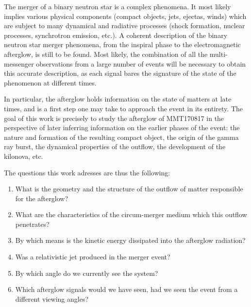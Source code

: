 The merger of a binary neutron star is a complex phenomena. It most likely implies various physical components (compact objects, jets, ejectas, winds) which are subject to many dynamical and radiative processes (shock formation, nuclear processes, synchrotron emission, etc.). A coherent description of the binary neutron star merger phenomena, from the inspiral phase to the electromagnetic afterglow, is still to be found. Most likely, the combination of all the multi-messenger observations from a large number of events will be necessary to obtain this accurate description, as each signal bares the signature of the state of the phenomenon at different times.

In particular, the afterglow holds information on the state of matters at late times, and is a first step one may take to approach the event in its entirety. The goal of this work is precisely to study the afterglow of MMT170817 in the perspective of later inferring information on the earlier phases of the event: the nature and formation of the resulting compact object, the origin of the gamma ray burst, the dynamical properties of the outflow, the development of the kilonova, etc.

The questions this work adresses are thus the following:

\begin{enumerate}
	\item What is the geometry and the structure of the outflow of matter responsible for the afterglow?
	\item What are the characteristics of the circum-merger medium which this outflow penetrates?
	\item By which means is the kinetic energy dissipated into the afterglow radiation?
	\item Was a relativistic jet produced in the merger event?
	\item By which angle do we currently see the system?
	\item Which afterglow signals would we have seen, had we seen the event from a different viewing angles?
\end{enumerate}
